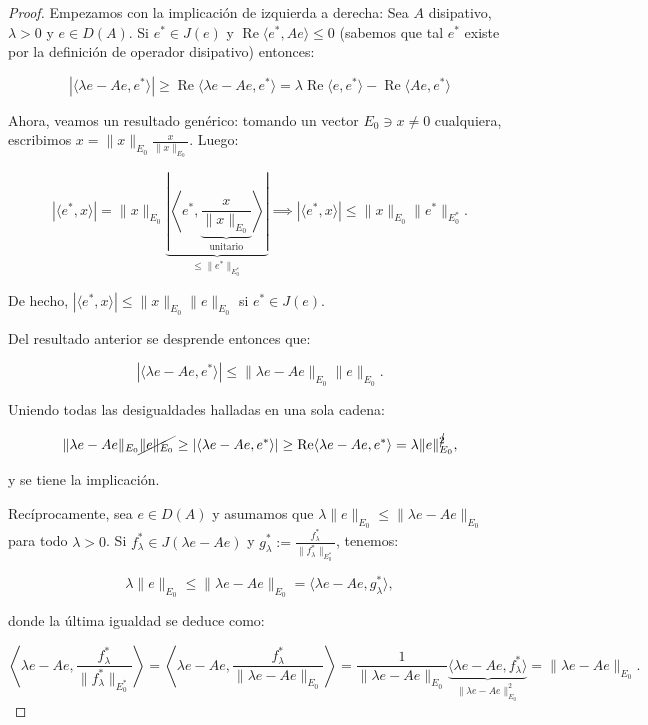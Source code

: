 \begin{proof}
    Empezamos con la implicación de izquierda a derecha: Sea $A$ disipativo, $\lambda > 0$ y $e \in D(A)$. Si $e^* \in J(e)$ y $\operatorname{Re}\langle e^*, Ae \rangle \leq 0$ (sabemos que tal $e^*$ existe por la definición de operador disipativo) entonces:

    \[|\langle\lambda e - Ae, e^* \rangle| \geq \operatorname{Re}\langle \lambda e - Ae, e^* \rangle = \lambda \operatorname{Re}\langle e, e^* \rangle - \operatorname{Re}\langle Ae, e^* \rangle\]

    Ahora, veamos un resultado genérico: tomando un vector $E_0 \ni x \neq 0$ cualquiera, escribimos $x = \lVert x \rVert_{E_0} \frac{x}{\lVert x \rVert_{E_0}}$. Luego:

    \[| \langle e^*, x\rangle| = \lVert x \rVert_{E_0} \underbrace{\left |\left \langle e^*, \underbrace{\frac{x}{\lVert x \rVert_{E_0}}}_{\text{unitario}} \right \rangle \right |}_{\leq \lVert e^* \rVert_{E_0^*}} \implies | \langle e^*, x\rangle| \leq \lVert x \rVert_{E_0} \lVert e^* \rVert_{E_0^*}.\]

    De hecho, $| \langle e^*, x\rangle| \leq \lVert x \rVert_{E_0} \lVert e \rVert_{E_0}$ si $e^* \in J(e)$. 
    
    Del resultado anterior se desprende entonces que:

    \[| \langle \lambda e - Ae, e^* \rangle | \leq \lVert \lambda e - Ae \rVert_{E_0} \lVert e \rVert_{E_0}.\]

    Uniendo todas las desigualdades halladas en una sola cadena:

    \[ \lVert \lambda e - Ae \rVert_{E_0} \cancel{\lVert e \rVert_{E_0}} \geq | \langle \lambda e - Ae, e^* \rangle | \geq \operatorname{Re} \langle \lambda e - Ae, e^* \rangle = \lambda \lVert e \rVert_{E_0}^{\cancel{2}}, \]

    y se tiene la implicación.

    Recíprocamente, sea $e \in D(A)$ y asumamos que $\lambda \lVert e \rVert_{E_0} \leq \lVert \lambda e - Ae \rVert_{E_0}$ para todo $\lambda > 0$. Si $f_\lambda^* \in J(\lambda e - Ae)$ y $g_\lambda^* := \frac{f_\lambda^*}{\lVert f_\lambda^* \rVert_{E_0^*}} $, tenemos:

    \[\lambda \lVert e \rVert_{E_0} \leq \lVert \lambda e - Ae \rVert_{E_0} = \langle \lambda e - Ae, g_\lambda^* \rangle,\]

    donde la última igualdad se deduce como:

    \[\left \langle \lambda e - Ae, \frac{f_\lambda^*}{\lVert f_\lambda^* \rVert_{E_0^*}}\right \rangle = \left \langle \lambda e - Ae, \frac{f_\lambda^*}{\lVert \lambda e - Ae \rVert_{E_0}}\right \rangle = \frac{1}{\lVert \lambda e - Ae \rVert_{E_0}}\underbrace{\langle \lambda e - Ae, f_\lambda^* \rangle}_{\lVert \lambda e - Ae \rVert_{E_0}^2} = \lVert \lambda e - Ae \rVert_{E_0}.\]


\end{proof}
